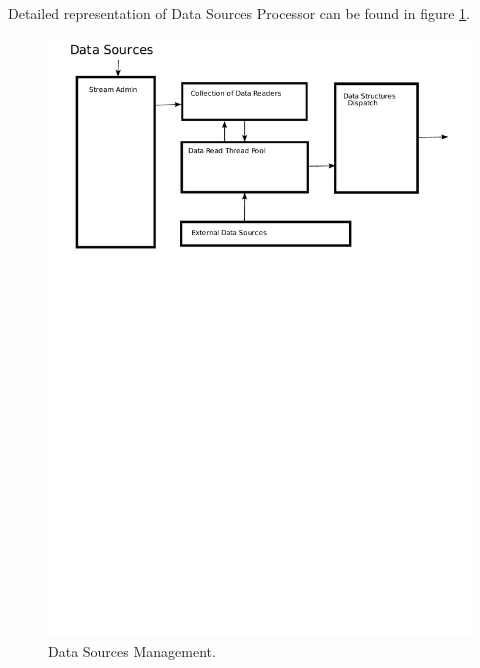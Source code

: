 \documentclass[14pt]{article}
\begin{document}
\noindent Detailed representation of Data Sources Processor can be found in figure \ref{DataSourcePic}.



\begin{figure}
  \includegraphics[width=5.00in]{../figures/DataSources.pdf}
  \caption{Data Sources Management.}
  \label{DataSourcePic}
\end{figure}
\end{document}
